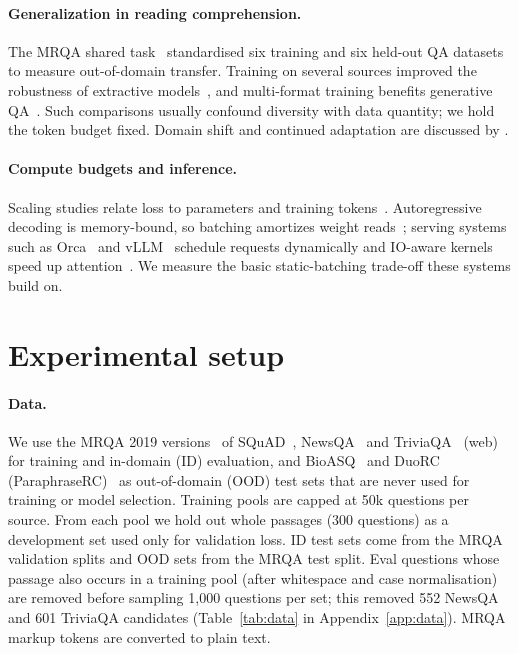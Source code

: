 \documentclass{article}
\begin{document}
\paragraph{Generalization in reading comprehension.} The MRQA shared task~\citep{fisch2019mrqa}
standardised six training and six held-out QA datasets to measure out-of-domain transfer. Training on
several sources improved the robustness of extractive models~\citep{talmor2019multiqa,fisch2019mrqa},
and multi-format training benefits generative QA~\citep{khashabi2020unifiedqa,raffel2020t5}. Such
comparisons usually confound diversity with data quantity; we hold the token budget fixed. Domain
shift and continued adaptation are discussed by \citet{gururangan2020dontstop}.

\paragraph{Compute budgets and inference.} Scaling studies relate loss to parameters and training
tokens~\citep{kaplan2020scaling,hoffmann2022chinchilla}. Autoregressive decoding is memory-bound, so
batching amortizes weight reads~\citep{pope2023inference}; serving systems such as Orca~\citep{yu2022orca}
and vLLM~\citep{kwon2023vllm} schedule requests dynamically and IO-aware kernels speed up
attention~\citep{dao2022flashattention}. We measure the basic static-batching trade-off these systems
build on.

\section{Experimental setup}
\label{sec:setup}

\paragraph{Data.} We use the MRQA 2019 versions~\citep{fisch2019mrqa} of SQuAD~\citep{rajpurkar2016squad},
NewsQA~\citep{trischler2017newsqa} and TriviaQA~\citep{joshi2017triviaqa} (web) for training and
in-domain (ID) evaluation, and BioASQ~\citep{tsatsaronis2015bioasq} and DuoRC
(ParaphraseRC)~\citep{saha2018duorc} as out-of-domain (OOD) test sets that are never used for training
or model selection. Training pools are capped at 50k questions per source. From each pool we hold out
whole passages (300 questions) as a development set used only for validation loss. ID test sets come
from the MRQA validation splits and OOD sets from the MRQA test split. Eval questions whose passage
also occurs in a training pool (after whitespace and case normalisation) are removed before sampling
1,000 questions per set; this removed 552 NewsQA and 601 TriviaQA candidates
(Table~\ref{tab:data} in Appendix~\ref{app:data}). MRQA markup tokens are converted to plain text.
\end{document}
